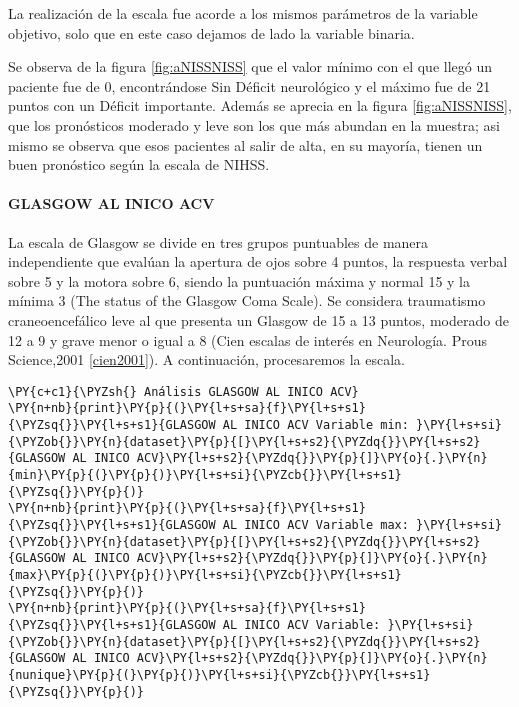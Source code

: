     La realización de la escala fue acorde a los mismos parámetros de la variable objetivo, solo que en este caso dejamos de lado la variable
binaria.

Se observa de la figura \ref{fig:aNISSNISS} que el valor mínimo con el que llegó un paciente fue de 0, encontrándose Sin Déficit neurológico y el máximo fue de 21 puntos con un Déficit importante. Además se aprecia en la figura \ref{fig:aNISSNISS}, que los pronósticos moderado y leve son los que más abundan en la muestra; asi mismo se observa que esos pacientes al salir de alta, en su mayoría, tienen un buen pronóstico según la escala de NIHSS.

    \hypertarget{glasgow-al-inico-acv}{%
\paragraph{GLASGOW AL INICO ACV}\label{glasgow-al-inico-acv}}

La escala de Glasgow se divide en tres grupos puntuables de manera independiente que evalúan la apertura de ojos sobre 4 puntos, la respuesta verbal sobre 5 y la motora sobre 6, siendo la puntuación máxima y normal 15 y la mínima 3 (The status of the Glasgow Coma Scale). Se considera traumatismo craneoencefálico leve al que presenta un Glasgow de 15 a 13 puntos, moderado de 12 a 9 y grave menor o igual a 8 (Cien escalas de interés en Neurología. Prous Science,2001 \ref{cien2001}). A continuación, procesaremos la escala.

    \begin{tcolorbox}[breakable, size=fbox, boxrule=1pt, pad at break*=1mm,colback=cellbackground, colframe=cellborder]
\begin{Verbatim}[commandchars=\\\{\}]
\PY{c+c1}{\PYZsh{} Análisis GLASGOW AL INICO ACV}
\PY{n+nb}{print}\PY{p}{(}\PY{l+s+sa}{f}\PY{l+s+s1}{\PYZsq{}}\PY{l+s+s1}{GLASGOW AL INICO ACV Variable min: }\PY{l+s+si}{\PYZob{}}\PY{n}{dataset}\PY{p}{[}\PY{l+s+s2}{\PYZdq{}}\PY{l+s+s2}{GLASGOW AL INICO ACV}\PY{l+s+s2}{\PYZdq{}}\PY{p}{]}\PY{o}{.}\PY{n}{min}\PY{p}{(}\PY{p}{)}\PY{l+s+si}{\PYZcb{}}\PY{l+s+s1}{\PYZsq{}}\PY{p}{)}
\PY{n+nb}{print}\PY{p}{(}\PY{l+s+sa}{f}\PY{l+s+s1}{\PYZsq{}}\PY{l+s+s1}{GLASGOW AL INICO ACV Variable max: }\PY{l+s+si}{\PYZob{}}\PY{n}{dataset}\PY{p}{[}\PY{l+s+s2}{\PYZdq{}}\PY{l+s+s2}{GLASGOW AL INICO ACV}\PY{l+s+s2}{\PYZdq{}}\PY{p}{]}\PY{o}{.}\PY{n}{max}\PY{p}{(}\PY{p}{)}\PY{l+s+si}{\PYZcb{}}\PY{l+s+s1}{\PYZsq{}}\PY{p}{)}
\PY{n+nb}{print}\PY{p}{(}\PY{l+s+sa}{f}\PY{l+s+s1}{\PYZsq{}}\PY{l+s+s1}{GLASGOW AL INICO ACV Variable: }\PY{l+s+si}{\PYZob{}}\PY{n}{dataset}\PY{p}{[}\PY{l+s+s2}{\PYZdq{}}\PY{l+s+s2}{GLASGOW AL INICO ACV}\PY{l+s+s2}{\PYZdq{}}\PY{p}{]}\PY{o}{.}\PY{n}{nunique}\PY{p}{(}\PY{p}{)}\PY{l+s+si}{\PYZcb{}}\PY{l+s+s1}{\PYZsq{}}\PY{p}{)}
\end{Verbatim}
\end{tcolorbox}

